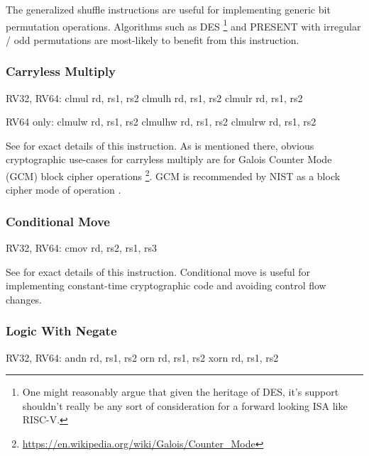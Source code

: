 The generalized shuffle instructions are useful for implementing
generic bit permutation operations.
Algorithms such as 
DES \footnote{
One might reasonably argue that given the heritage of DES, it's support
shouldn't really be any sort of consideration for a forward looking
ISA like RISC-V.
}
and
PRESENT\cite{block:present} with
irregular / odd permutations are most-likely to benefit from this
instruction.


\subsubsection{Carryless Multiply}

\begin{isa}
RV32, RV64:
    clmul rd, rs1, rs2
    clmulh rd, rs1, rs2
    clmulr rd, rs1, rs2

RV64 only:
    clmulw rd, rs1, rs2
    clmulhw rd, rs1, rs2
    clmulrw rd, rs1, rs2
\end{isa}

See \cite[Section 2.6]{riscv:bitmanip:draft} for exact details of
this instruction.
As is mentioned there, obvious cryptographic use-cases for carryless
multiply are for Galois Counter Mode (GCM) block cipher operations
\footnote{\url{https://en.wikipedia.org/wiki/Galois/Counter_Mode}}.
GCM is recommended by NIST as a block cipher mode of operation
\cite{nist:gcm}.

\subsubsection{Conditional Move}

\begin{isa}
RV32, RV64:
    cmov rd, rs2, rs1, rs3
\end{isa}

See \cite[Section 2.9.2]{riscv:bitmanip:draft} for exact details of
this instruction.
Conditional move is useful for implementing constant-time cryptographic
code and avoiding control flow changes.

\subsubsection{Logic With Negate}

\begin{isa}
RV32, RV64:
    andn rd, rs1, rs2
     orn rd, rs1, rs2
    xorn rd, rs1, rs2
\end{isa}

